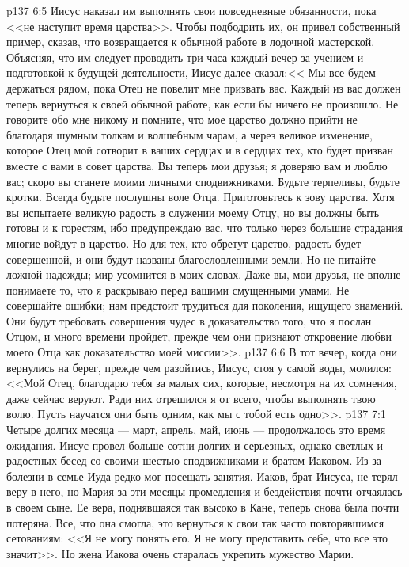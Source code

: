 \vs p137 6:5 Иисус наказал им выполнять свои повседневные обязанности, пока <<не наступит время царства>>. Чтобы подбодрить их, он привел собственный пример, сказав, что возвращается к обычной работе в лодочной мастерской. Объясняя, что им следует проводить три часа каждый вечер за учением и подготовкой к будущей деятельности, Иисус далее сказал:<< Мы все будем держаться рядом, пока Отец не повелит мне призвать вас. Каждый из вас должен теперь вернуться к своей обычной работе, как если бы ничего не произошло. Не говорите обо мне никому и помните, что мое царство должно прийти не благодаря шумным толкам и волшебным чарам, а через великое изменение, которое Отец мой сотворит в ваших сердцах и в сердцах тех, кто будет призван вместе с вами в совет царства. Вы теперь мои друзья; я доверяю вам и люблю вас; скоро вы станете моими личными сподвижниками. Будьте терпеливы, будьте кротки. Всегда будьте послушны воле Отца. Приготовьтесь к зову царства. Хотя вы испытаете великую радость в служении моему Отцу, но вы должны быть готовы и к горестям, ибо предупреждаю вас, что только через большие страдания многие войдут в царство. Но для тех, кто обретут царство, радость будет совершенной, и они будут названы благословленными земли. Но не питайте ложной надежды; мир усомнится в моих словах. Даже вы, мои друзья, не вполне понимаете то, что я раскрываю перед вашими смущенными умами. Не совершайте ошибки; нам предстоит трудиться для поколения, ищущего знамений. Они будут требовать совершения чудес в доказательство того, что я послан Отцом, и много времени пройдет, прежде чем они признают откровение любви моего Отца как доказательство моей миссии>>.
\vs p137 6:6 В тот вечер, когда они вернулись на берег, прежде чем разойтись, Иисус, стоя у самой воды, молился: <<Мой Отец, благодарю тебя за малых сих, которые, несмотря на их сомнения, даже сейчас веруют. Ради них отрешился я от всего, чтобы выполнять твою волю. Пусть научатся они быть одним, как мы с тобой есть одно>>.
\vs p137 7:1 Четыре долгих месяца --- март, апрель, май, июнь --- продолжалось это время ожидания. Иисус провел больше сотни долгих и серьезных, однако светлых и радостных бесед со своими шестью сподвижниками и братом Иаковом. Из\hyp{}за болезни в семье Иуда редко мог посещать занятия. Иаков, брат Иисуса, не терял веру в него, но Мария за эти месяцы промедления и бездействия почти отчаялась в своем сыне. Ее вера, поднявшаяся так высоко в Кане, теперь снова была почти потеряна. Все, что она смогла, это вернуться к свои так часто повторявшимся сетованиям: <<Я не могу понять его. Я не могу представить себе, что все это значит>>. Но жена Иакова очень старалась укрепить мужество Марии.

